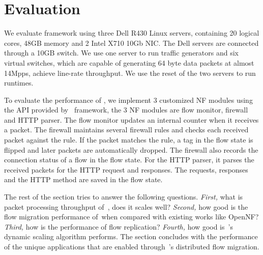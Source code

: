 \section{Evaluation}
\label{sec:experiments}



We evaluate \nfactor framework using three Dell R430 Linux servers, containing 20 logical cores, 48GB memory and 2 Intel X710 10Gb NIC. The Dell servers are connected through a 10GB switch. We use one server to run traffic generators and six virtual switches, which are capable of generating 64 byte data packets at almost 14Mpps, achieve line-rate throughput. We use the reset of the two servers to run runtimes.

To evaluate the performance of \nfactor, we implement 3 customized NF modules using the API provided by \nfactor~framework, the 3 NF modules are flow monitor, firewall and HTTP parser. The flow monitor updates an internal counter when it receives a packet. The firewall maintains several firewall rules and checks each received packet against the rule. If the packet matches the rule, a tag in the flow state is flipped and later packets are automatically dropped. The firewall also records the connection status of a flow in the flow state. For the HTTP parser, it parses the received packets for the HTTP request and responses. The requests, responses and the HTTP method are saved in the flow state. %

The rest of the section tries to answer the following questions. \textit{First, } what is packet processing throughput of~\nfactor, does it scales well? \textit{Second,} how good is the flow migration performance of~\nfactor when compared with existing works like OpenNF? \textit{Third,} how is the performance of flow replication? \textit{Fourth,} how good is~\nfactor's dynamic scaling algorithm performs. The section concludes with the performance of the unique applications that are enabled through~\nfactor's distributed flow migration.

